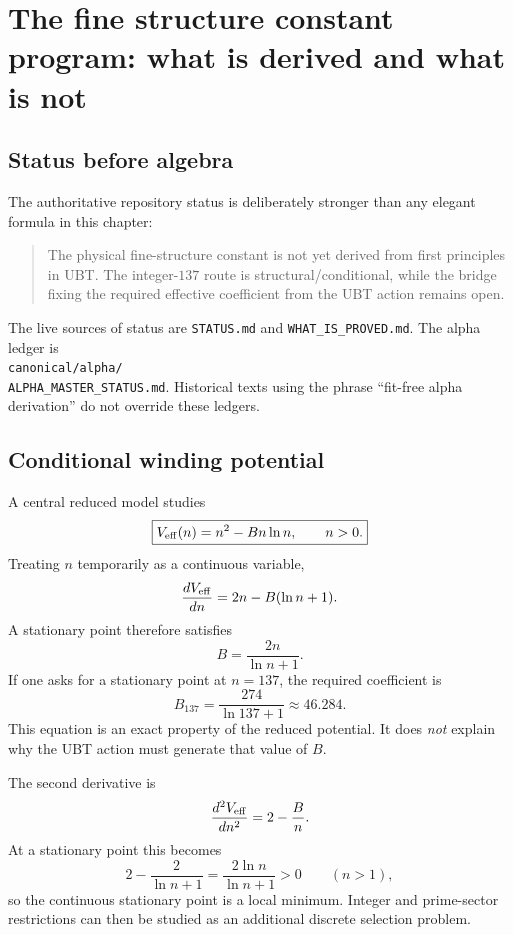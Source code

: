 
\chapter{The fine structure constant program: what is derived and what is not}
\label{ch:alpha}

\section{Status before algebra}
The authoritative repository status is deliberately stronger than any elegant
formula in this chapter:
\begin{quote}
The physical fine-structure constant is not yet derived from first principles
in UBT.  The integer-$137$ route is structural/conditional, while the bridge
fixing the required effective coefficient from the UBT action remains open.
\end{quote}
The live sources of status are \texttt{STATUS.md} and
\texttt{WHAT\_IS\_PROVED.md}. The alpha ledger is\\
\texttt{canonical/alpha/}\\
\texttt{ALPHA\_MASTER\_STATUS.md}. Historical texts using the
phrase ``fit-free alpha derivation'' do not override these ledgers.

\section{Conditional winding potential}
A central reduced model studies
\[
 \boxed{V_{\rm eff}(n)=n^2-Bn\ln n,\qquad n>0.}
\]
Treating $n$ temporarily as a continuous variable,
\[
 \frac{dV_{\rm eff}}{dn}
 =2n-B(\ln n+1).
\]
A stationary point therefore satisfies
\[
 \boxed{B=\frac{2n}{\ln n+1}.}
\]
If one asks for a stationary point at $n=137$, the required coefficient is
\[
 B_{137}=\frac{274}{\ln137+1}\approx46.284.
\]
This equation is an exact property of the reduced potential.  It does
\emph{not} explain why the UBT action must generate that value of $B$.

The second derivative is
\[
 \frac{d^2V_{\rm eff}}{dn^2}=2-\frac{B}{n}.
\]
At a stationary point this becomes
\[
 2-\frac{2}{\ln n+1}
 =\frac{2\ln n}{\ln n+1}>0
 \qquad(n>1),
\]
so the continuous stationary point is a local minimum.  Integer and
prime-sector restrictions can then be studied as an additional discrete
selection problem.

